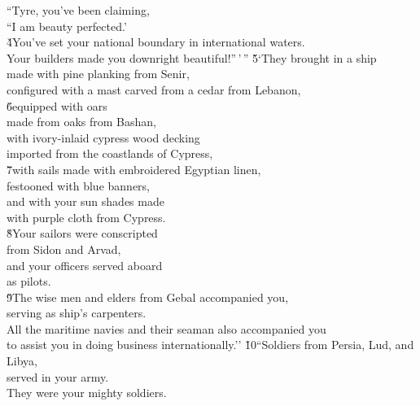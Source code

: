 \begin{poetry}
\poeml ``Tyre, you've been claiming, \\
\poemll    ``I am beauty perfected.' \\
\poeml \v{4}You've set your national boundary in international waters. \\
\poemll    Your builders made you downright beautiful!''\,'\,''
\poeml \v{5}`They brought in a ship \\
\poemll    made with pine planking from Senir, \\
\poeml configured with a mast carved from a cedar from Lebanon, \\
\poeml \v{6}equipped with oars \\
\poemll    made from oaks from Bashan, \\
\poeml with ivory-inlaid cypress wood decking \\
\poemll    imported from the coastlands of Cypress, \\
\poeml \v{7}with sails made with embroidered Egyptian linen, \\
\poemll    festooned with blue banners, \\
\poeml and with your sun shades made \\
\poemll    with purple cloth from Cypress. \\
\poeml \v{8}Your sailors were conscripted \\
\poemll    from Sidon and Arvad, \\
\poeml and your officers served aboard \\
\poemll    as pilots. \\
\poeml \v{9}The wise men and elders from Gebal accompanied you, \\
\poemll    serving as ship's carpenters. \\
\poeml All the maritime navies and their seaman also accompanied you \\
\poemll    to assist you in doing business internationally.''
\poeml \v{10}``Soldiers from Persia, Lud, and Libya, \\
\poemll    served in your army. \\
\poemlll       They were your mighty soldiers. \\

\end{poetry}
